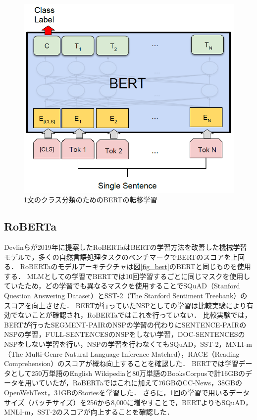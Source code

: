 \documentclass[12pt,a4j]{jreport}
\begin{document}
\begin{figure}[H]
	\centering
	\includegraphics[keepaspectratio, width=120mm]{img/single-sentence-classification-of-bert.png}
	\caption{1文のクラス分類のためのBERTの転移学習\protect\footnotemark[6]}
	\label{fig_single_sentence_classification_of_bert}
\end{figure}




\subsection{RoBERTa}
Devlinらが2019年に提案したRoBERTaはBERTの学習方法を改善した機械学習モデルで，多くの自然言語処理タスクのベンチマークでBERTのスコアを上回る．
RoBERTaのモデルアーキテクチャは図\ref{fig_bert}のBERTと同じものを使用する．
MLMとしての学習でBERTでは10回学習するごとに同じマスクを使用していたため，どの学習でも異なるマスクを使用することでSQuAD（Stanford Question Answering Dataset）とSST-2（The Stanford Sentiment Treebank）のスコアを向上させた．
BERTが行っていたNSPとしての学習は比較実験により有効でないことが確認され，RoBERTaではこれを行っていない．
比較実験では，BERTが行ったSEGMENT-PAIRのNSPの学習の代わりにSENTENCE-PAIRのNSPの学習，FULL-SENTENCESのNSPをしない学習，DOC-SENTENCESのNSPをしない学習を行い，NSPの学習を行わなくてもSQuAD，SST-2，MNLI-m（The Multi-Genre Natural Language Inference Matched），RACE（Reading Comprehension）のスコアが概ね向上することを確認した．
BERTでは学習データとして250万単語のEnglish Wikipediaと80万単語のBooksCorpusで計16GBのデータを用いていたが，RoBERTaではこれに加えて76GBのCC-News，38GBのOpenWebText，31GBのStoriesを学習した．
さらに，1回の学習で用いるデータサイズ（バッチサイズ）を256から8,000に増やすことで，BERTよりもSQuAD，MNLI-m，SST-2のスコアが向上することを確認した．
\end{document}
